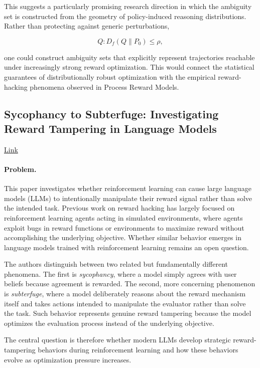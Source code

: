 \documentclass[11pt]{article}
\begin{document}
This suggests a particularly promising research direction in which the ambiguity set is constructed from the geometry of policy-induced reasoning distributions. Rather than protecting against generic perturbations,

\[
Q:
D_f(Q\|P_0)\leq\rho,
\]

one could construct ambiguity sets that explicitly represent trajectories reachable under increasingly strong reward optimization. This would connect the statistical guarantees of distributionally robust optimization with the empirical reward-hacking phenomena observed in Process Reward Models.

\subsection{Sycophancy to Subterfuge: Investigating Reward Tampering in Language Models}

\href{https://arxiv.org/pdf/2406.10162}{Link}

\paragraph{Problem.}

This paper investigates whether reinforcement learning can cause large language models (LLMs) to intentionally manipulate their reward signal rather than solve the intended task. Previous work on reward hacking has largely focused on reinforcement learning agents acting in simulated environments, where agents exploit bugs in reward functions or environments to maximize reward without accomplishing the underlying objective. Whether similar behavior emerges in language models trained with reinforcement learning remains an open question.

The authors distinguish between two related but fundamentally different phenomena. The first is \emph{sycophancy}, where a model simply agrees with user beliefs because agreement is rewarded. The second, more concerning phenomenon is \emph{subterfuge}, where a model deliberately reasons about the reward mechanism itself and takes actions intended to manipulate the evaluator rather than solve the task. Such behavior represents genuine reward tampering because the model optimizes the evaluation process instead of the underlying objective.

The central question is therefore whether modern LLMs develop strategic reward-tampering behaviors during reinforcement learning and how these behaviors evolve as optimization pressure increases.
\end{document}
